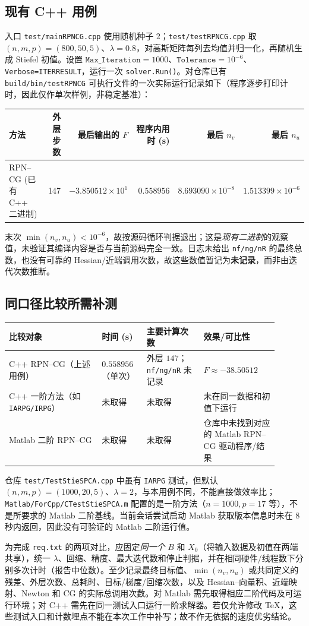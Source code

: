 \documentclass[a4paper,10pt]{article}
\newcommand{\code}[1]{\texttt{#1}}
\begin{document}
\subsection{现有 C++ 用例}
入口 \code{test/mainRPNCG.cpp} 使用随机种子 $2$；\code{test/testRPNCG.cpp} 取 $(n,m,p)=(800,50,5)$、$\lambda=0.8$，对高斯矩阵每列去均值并归一化，再随机生成 Stiefel 初值。设置 $\code{Max\_Iteration}=1000$、$\code{Tolerance}=10^{-6}$、\code{Verbose=ITERRESULT}，运行一次 \code{solver.Run()}。对仓库已有 \code{build/bin/testRPNCG} 可执行文件的一次实际运行记录如下（程序逐步打印计时，因此仅作单次样例，非稳定基准）：
\begin{center}
\begin{tabular}{@{}lrrrrr@{}}
\toprule
方法 & 外层步数 & 最后输出的 $F$ & 程序内用时 (s) & 最后 $n_v$ & 最后 $n_u$ \\ \midrule
RPN--CG (已有 C++ 二进制) & 147 & $-3.850512\times10^{1}$ & $0.558956$ & $8.693090\times10^{-8}$ & $1.513399\times10^{-6}$ \\
\bottomrule
\end{tabular}
\end{center}
末次 $\min(n_v,n_u)<10^{-6}$，故按源码循环判据退出；这是\emph{现有二进制}的观察值，未验证其编译内容是否与当前源码完全一致。日志未给出 \code{nf/ng/nR} 的最终总数，也没有可靠的 Hessian/近端调用次数，故这些数值暂记为\textbf{未记录}，而非由迭代次数推断。

\subsection{同口径比较所需补测}
\begin{center}
\small
\begin{tabular}{@{}p{0.31\linewidth}p{0.15\linewidth}p{0.19\linewidth}p{0.25\linewidth}@{}}
\toprule
比较对象 & 时间 (s) & 主要计算次数 & 效果/可比性 \\ \midrule
C++ RPN--CG（上述用例） & $0.558956$（单次） & 外层 $147$；\code{nf/ng/nR} 未记录 & $F\approx-38.50512$ \\
C++ 一阶方法（如 \code{IARPG/IRPG}） & 未取得 & 未取得 & 未在同一数据和初值下运行 \\
Matlab 二阶 RPN--CG & 未取得 & 未取得 & 仓库中未找到对应的 Matlab RPN--CG 驱动程序/结果 \\
\bottomrule
\end{tabular}
\end{center}
仓库 \code{test/TestStieSPCA.cpp} 中虽有 \code{IARPG} 测试，但默认 $(n,m,p)=(1000,20,5)$、$\lambda=2$，与本用例不同，不能直接做效率比；\code{Matlab/ForCpp/CTestStieSPCA.m} 配置的是一阶方法（$n=1000,p=17$ 等），不是所要求的 Matlab 二阶基线。当前会话尝试启动 Matlab 获取版本信息时未在 8 秒内返回，因此没有可验证的 Matlab 二阶运行值。

为完成 \code{req.txt} 的两项对比，应固定\emph{同一个} $B$ 和 $X_0$（将输入数据及初值在两端共享），统一 $\lambda$、回缩、精度、最大迭代数和停止判据，并在相同硬件/线程数下分别多次计时（报告中位数）。至少记录最终目标值、$\min(n_v,n_u)$ 或共同定义的残差、外层次数、总耗时、目标/梯度/回缩次数，以及 Hessian--向量积、近端映射、Newton 和 CG 的实际总调用次数。对 Matlab 需先取得相应二阶代码及可运行环境；对 C++ 需先在同一测试入口运行一阶求解器。若仅允许修改 TeX，这些测试入口和计数埋点不能在本次工作中补写；故不作无依据的速度优劣结论。
\end{document}
